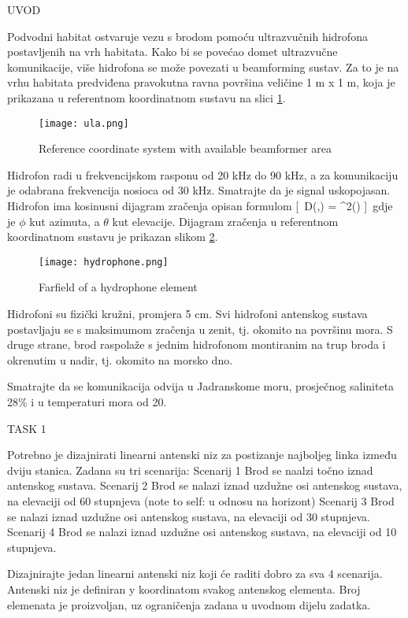 UVOD

Podvodni habitat ostvaruje vezu s brodom pomoću ultrazvučnih hidrofona postavljenih na vrh habitata. Kako bi se povećao domet ultrazvučne komunikacije, više hidrofona se može povezati u beamforming sustav. Za to je na vrhu habitata predviđena pravokutna ravna površina veličine 1 m x 1 m, koja je prikazana u referentnom koordinatnom sustavu na slici \ref{fig:coord}.
\begin{figure}[h!]
   \centering
   \texttt{[image: ula.png]}
   \caption{Reference coordinate system with available beamformer area}
   \label{fig:coord}
\end{figure}

Hidrofon radi u frekvencijskom rasponu od 20 kHz do 90 kHz, a za komunikaciju je odabrana frekvencija nosioca od 30 kHz. Smatrajte da je signal uskopojasan. Hidrofon ima kosinusni dijagram zračenja opisan formulom
[\ D(\phi,\theta) = \cos^2(\theta) ]\
gdje je $\phi$ kut azimuta, a $\theta$ kut elevacije. Dijagram zračenja u referentnom koordinatnom sustavu je prikazan slikom \ref{fig:hydrophone}.
\begin{figure}[h!]
   \centering
   \texttt{[image: hydrophone.png]}
   \caption{Farfield of a hydrophone element}
   \label{fig:hydrophone}
\end{figure}
Hidrofoni su fizički kružni, promjera 5 cm. Svi hidrofoni antenskog sustava postavljaju se s maksimumom zračenja u zenit, tj. okomito na površinu mora. S druge strane, brod raspolaže s jednim hidrofonom montiranim na trup broda i okrenutim u nadir, tj. okomito na morsko dno.

Smatrajte da se komunikacija odvija u Jadranskome moru, prosječnog saliniteta 28\% i u temperaturi mora od 20\circ.


TASK 1

Potrebno je dizajnirati linearni antenski niz za postizanje najboljeg linka između dviju stanica. Zadana su tri scenarija:
Scenarij 1
Brod se naalzi točno iznad antenskog sustava.
Scenarij 2
Brod se nalazi iznad uzdužne osi antenskog sustava, na elevaciji od 60 stupnjeva (note to self: u odnosu na horizont)
Scenarij 3
Brod se nalazi iznad uzdužne osi antenskog sustava, na elevaciji od 30 stupnjeva.
Scenarij 4
Brod se nalazi iznad uzdužne osi antenskog sustava, na elevaciji od 10 stupnjeva.

Dizajnirajte jedan linearni antenski niz koji će raditi dobro za sva 4 scenarija. Antenski niz je definiran y koordinatom svakog antenskog elementa. Broj elemenata je proizvoljan, uz ograničenja zadana u uvodnom dijelu zadatka.

